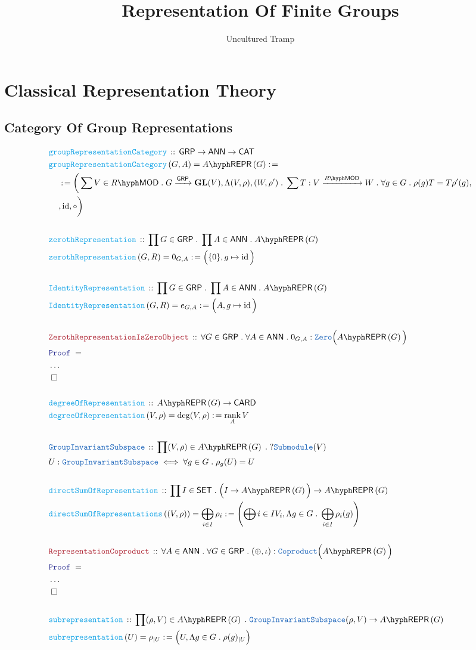 \documentclass[12pt]{scrartcl}%
\title{Representation Of Finite Groups}
\author{Uncultured Tramp}
\newcommand{\TYPE}[1]{\textcolor{NavyBlue}{\mathtt{#1}}}%
\newcommand{\FUNC}[1]{\textcolor{Cerulean}{\mathtt{#1}}}%
\newcommand{\LOGIC}[1]{\textcolor{Blue}{\mathtt{#1}}}%
\newcommand{\THM}[1]{\textcolor{Maroon}{\mathtt{#1}}}%
\renewcommand{\.}{\; . \;} %
\newcommand{\de}{: \kern 0.1pc =} %
\newcommand{\Act}[1]{\left( #1 \right)} %
\newcommand{\Theorem}[2]{& \THM{#1} \, :: \, #2 \\ & \Proof = \\ } %
\newcommand{\DeclareType}[2]{& \TYPE{#1} \, :: \, #2 \\}%
\newcommand{\DefineType}[3]{& #1 : \TYPE{#2} \iff #3 \\}%
\newcommand{\DeclareFunc}[2]{& \FUNC{#1} \, :: \, #2 \\}%
\newcommand{\DefineNamedFunc}[4]{&  \FUNC{#1}\Act{#2} = #3 \de #4 \\}%
\newcommand{\NewLine}{\\ & \kern 1pc}%
\newcommand{\Page}[1]{ \begin{align*} #1 \end{align*}  }%
\newcommand{\NoProof}{ & \ldots \\ \EndProof}%
\DeclareMathOperator*{\id}{id}%
\newcommand{\QED}{\; \square} %
\newcommand{\EndProof}{& \QED \\} %
\newcommand{\Proof}{\LOGIC{Proof} \; } %
\newcommand{\Arrow}[1]{\xrightarrow{#1}}%
\newcommand{\CAT}{\mathsf{CAT}} %
\newcommand{\SET}{\mathsf{SET}} %
\newcommand{\GIS}{\TYPE{GroupInvariantSubspace}}
\DeclareMathOperator{\rank}{rank} %
\newcommand{\GRP}{\mathsf{GRP}} %
\newcommand{\REPR}[2]{#1\hyph\mathsf{REPR}\left(#2\right)}
\newcommand{\GL}{\mathbf{GL}}%
\newcommand{\LMOD}[1]{#1\hyph\mathsf{MOD}} %
\newcommand{\ANN}{\mathsf{ANN}} %
\begin{document}
\maketitle
\normalsize
\newpage
\tableofcontents
\newpage
\section{Classical Representation Theory}
\subsection{Category Of Group Representations}
\Page{
	\DeclareFunc{groupRepresentationCategory}
	{ \GRP \to \ANN \to \CAT }
	\DefineNamedFunc{groupRepresentationCategory}
	{G,A}{\REPR{A}{G}}
	{
		\NewLine \de
		\bigg(  \sum V \in \LMOD{R} \. G \Arrow{\GRP} \GL(V) ,
			\Lambda (V,\rho),(W,\rho') \. 
			\sum T : V \Arrow{\LMOD{R}} W \.
			\forall g \in G \. \rho(g)T = T\rho'(g),
			\NewLine
			,\id, \circ \bigg)    
	}
	\\
	\DeclareFunc{zerothRepresentation}
	{\prod G \in \GRP \. \prod A \in \ANN \. \REPR{A}{G}}
	\DefineNamedFunc{zerothRepresentation}{G,R}
	{0_{G,A}}{\Big(\{0\},g \mapsto \id\Big)}  
	\\
	\DeclareFunc{IdentityRepresentation}
	{\prod G \in \GRP \. \prod A \in \ANN \. \REPR{A}{G}}
	\DefineNamedFunc{IdentityRepresentation}{G,R}
	{e_{G,A}}{\Big(A,g \mapsto \id\Big)} 
	\\
	\Theorem{ZerothRepresentationIsZeroObject}
	{
		\forall G \in \GRP \.
		\forall A \in \ANN \.
		0_{G,A} : \TYPE{Zero}\Big( \REPR{A}{G} \Big)  
	}
	\NoProof
	\\
	\DeclareFunc{degreeOfRepresentation}
	{ 
		\REPR{A}{G} \to \mathsf{CARD}
	}
	\DefineNamedFunc{degreeOfRepresentation}
	{ V, \rho  }{ \deg (V,\rho) }{\rank_A V}
	\\
	\DeclareType{\GIS}
	{
		\prod (V,\rho) \in \REPR{A}{G} \. ? \TYPE{Submodule}(V)   
	}
	\DefineType{U}{\GIS}
	{\forall g \in G \. \rho_g(U) = U}
	\\
	\DeclareFunc{directSumOfRepresentation}
	{
		\prod I \in \SET \.
		\Big(I \to \REPR{A}{G} \Big)
		\to \REPR{A}{G}   
	}
	\DefineNamedFunc{directSumOfRepresentations}
	{ (V,\rho) }{ \bigoplus_{i \in I} \rho_i }
	{
		\left( 
			\bigoplus{i \in I} V_i,
			\Lambda g \in G \. \bigoplus_{i\in I} \rho_i(g)     
		\right) 
	}
	\\
	\Theorem{RepresentationCoproduct}
	{
		\forall A \in \ANN \.
		\forall G \in \GRP \.
		(\oplus,\iota) : \TYPE{Coproduct}
		\Big( \REPR{A}{G} \Big)
	}
	\NoProof
	\\
	\DeclareFunc{subrepresentation}
	{
		\prod (\rho,V) \in \REPR{A}{G} \. 
		\GIS(\rho,V) \to \REPR{A}{G}
	}
	\DefineNamedFunc{subrepresentation}{U}
	{ \rho_{|U}   }{ \Big(U , \Lambda g \in G \. \rho(g)_{|U} \Big) }
}
\end{document}
